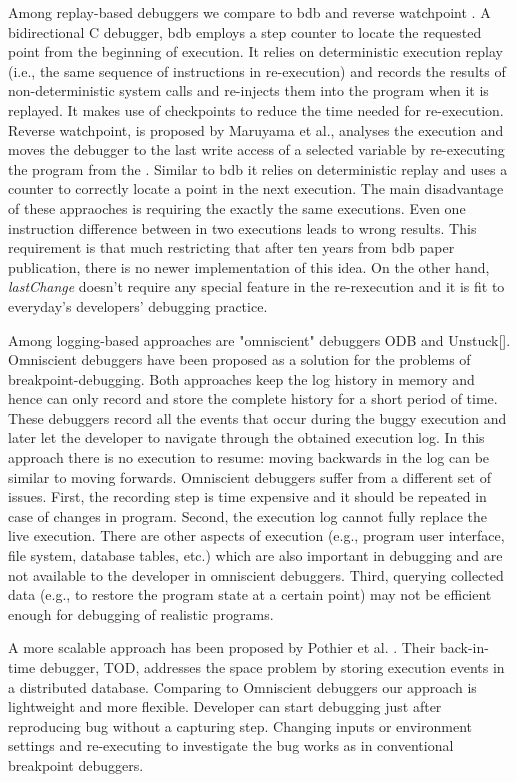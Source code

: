 \documentclass[preprint]{sigplanconf}
\begin{document}
Among replay-based debuggers we compare to bdb \cite{Boothe} and
reverse watchpoint \cite{Maruyama}.  A bidirectional C debugger, bdb
employs a step counter to locate the requested point from the
beginning of execution. It relies on deterministic execution replay
(i.e., the same sequence of instructions in re-execution) and records
the results of non-deterministic system calls and re-injects them into
the program when it is replayed. It makes use of checkpoints to reduce
the time needed for re-execution.  Reverse watchpoint, is proposed by
Maruyama et al., analyses the execution and moves the debugger to the
last write access of a selected variable by re-executing the program
from the \cite{Maruyama}.  Similar to bdb it relies on deterministic
replay and uses a counter to correctly locate a point in the next
execution. The main disadvantage of these appraoches is requiring the
exactly the same executions. Even one instruction difference between
in two executions leads to wrong results. This requirement is that
much restricting that after ten years from bdb paper publication,
there is no newer implementation of this idea. On the other hand,
\textit{lastChange} doesn't require any special feature in the
re-rexecution and it is fit to everyday's developers' debugging
practice.

Among logging-based approaches are "omniscient" debuggers
ODB\cite{Lewis} and Unstuck[]. Omniscient debuggers have been proposed
as a solution for the problems of breakpoint-debugging. Both
approaches keep the log history in memory and hence can only record
and store the complete history for a short period of time. These
debuggers record all the events that occur during the buggy execution
and later let the developer to navigate through the obtained execution
log. In this approach there is no execution to resume: moving
backwards in the log can be similar to moving forwards. Omniscient
debuggers suffer from a different set of issues. First, the recording
step is time expensive and it should be repeated in case of changes in
program. Second, the execution log cannot fully replace the live
execution. There are other aspects of execution (e.g., program user
interface, file system, database tables, etc.) which are also
important in debugging and are not available to the developer in
omniscient debuggers. Third, querying collected data (e.g., to restore
the program state at a certain point) may not be efficient enough for
debugging of realistic programs.

A more scalable approach has been proposed by Pothier et
al. \cite{Pothier}. Their back-in-time debugger, TOD, addresses the
space problem by storing execution events in a distributed
database. Comparing to Omniscient debuggers our approach is
lightweight and more flexible. Developer can start debugging just
after reproducing bug without a capturing step.  Changing inputs or
environment settings and re-executing to investigate the bug works as
in conventional breakpoint debuggers.
\end{document}

